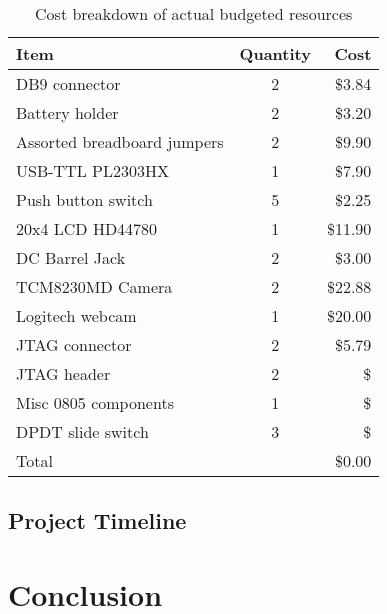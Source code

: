 \documentclass[11pt, a4paper, oneside]{Thesis} %
\begin{document}
\begin{table}[h]
  \centering
  \begin{tabular}{l c r}
    \hline
    Item & Quantity & Cost\\
    \hline    
    DB9 connector & 2 & \$3.84 \\ 
    Battery holder & 2 & \$3.20 \\ 
    Assorted breadboard jumpers & 2 & \$9.90 \\ 
    USB-TTL PL2303HX & 1 & \$7.90 \\ 
    Push button switch & 5 & \$2.25 \\ 
    20x4 LCD HD44780 & 1 & \$11.90 \\ 
    DC Barrel Jack & 2 & \$3.00 \\ 
    TCM8230MD Camera & 2 & \$22.88 \\ 
    Logitech webcam & 1 & \$20.00 \\ 
    JTAG connector & 2 & \$5.79 \\ 
    JTAG header & 2 & \$ \\
    Misc 0805 components & 1 & \$ \\ 
    DPDT slide switch & 3 & \$ \\
    \hline \hline
    Total & & \$0.00 \\ 
    \hline
  \end{tabular}
  \caption{Cost breakdown of actual budgeted resources}
  \label{tab:real_budget}
\end{table}

\section{Project Timeline}




\chapter{Conclusion}
\label{chap:conc} %
\end{document}
